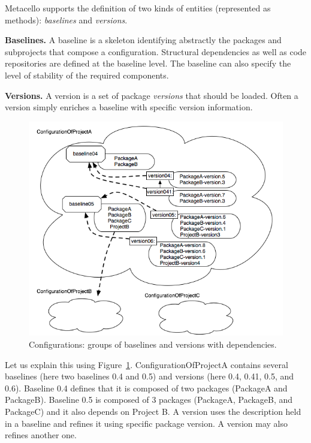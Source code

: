 \documentclass[a4paper,10pt,twoside]{book}
\begin{document}
Metacello supports the definition of two kinds of entities (represented as methods): \emph{baselines} and \emph{versions}.

\begin{description}
\item{\textbf{Baselines.}} A baseline is a skeleton identifying abstractly the packages and subprojects that compose a configuration. Structural dependencies as well as code repositories are defined at the baseline level. The baseline can also specify the level of stability of the required components. 
\item{\textbf{Versions.}} A version is a set of package \emph{versions} that should be loaded. Often a version simply enriches a baseline with specific version information. 
\end{description}


 
\begin{figure}
\begin{center}
\includegraphics[width=0.8\linewidth]{configurations}
\caption{Configurations: groups of baselines and versions with dependencies.\label{configurations}}
\end{center}
\end{figure} 


Let us explain this using Figure~\ref{configurations}. ConfigurationOfProjectA contains several baselines (here two baselines 0.4 and 0.5) and versions (here 0.4, 0.41, 0.5, and 0.6). Baseline 0.4 defines that it is composed of two packages (PackageA and PackageB). Baseline 0.5 is composed of 3 packages (PackageA, PackageB, and PackageC) and it also depends on Project B. A version uses the description held in a baseline and refines it using specific package version. A version may also refines another one. 
\end{document}
